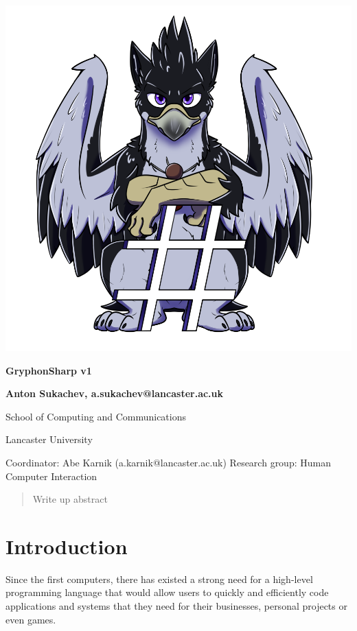 \documentclass{article}
\begin{document}
\begin{titlepage}

    \center

    \includegraphics[scale=0.5]{AzuGryphonSharp.png} %

    \huge  \textbf{GryphonSharp v1}

    \vspace{2cm}

    \Large \textbf{Anton Sukachev, a.sukachev@lancaster.ac.uk}

    School of Computing and Communications

    Lancaster University

    \vfill

    Coordinator: Abe Karnik (a.karnik@lancaster.ac.uk)\endgraf
    Research group: Human Computer Interaction

\end{titlepage}
\pagebreak

\tableofcontents
\pagebreak
    

\begin{abstract}
    Write up abstract
\end{abstract}

\section{Introduction}
Since the first computers, there has existed a strong need for a high-level programming language that would allow users to quickly and efficiently code applications and systems that they need for their businesses, personal projects or even games.  
\end{document}

